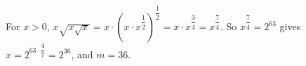 For $x>0$, $x\sqrt{x\sqrt x}=x\cdot\left(x\cdot x^{\dfrac12}\right)^{\dfrac12}=x\cdot x^{\dfrac34}=x^{\dfrac74}$. So $x^{\dfrac74}=2^{63}$ gives $x=2^{63\cdot\dfrac47}=2^{36}$, and $m=\boxed{36}$.
